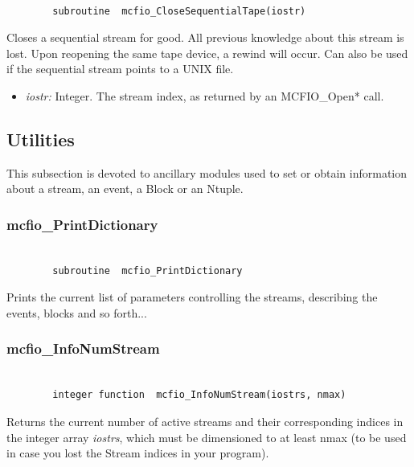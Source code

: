 \begin{verbatim}

        subroutine  mcfio_CloseSequentialTape(iostr)

\end{verbatim}

Closes a sequential stream for good. All previous knowledge
about this stream is lost.  Upon reopening the same tape device, a rewind will
occur. Can also be used if the sequential stream points to a UNIX file.
\begin{itemize}
\item {\em iostr:} Integer. The stream index, as returned by an MCFIO\_Open*
call.
\end{itemize}

\subsection{Utilities}

	This subsection is devoted to ancillary modules used to set or obtain
information about a stream, an event, a Block or an Ntuple.

\subsubsection{mcfio\_PrintDictionary}

\begin{verbatim}

        subroutine  mcfio_PrintDictionary

\end{verbatim}

Prints the current list of parameters controlling the streams,
describing the events, blocks and so forth...

\subsubsection{mcfio\_InfoNumStream}

\begin{verbatim}

        integer function  mcfio_InfoNumStream(iostrs, nmax)

\end{verbatim}

Returns the current number of active streams and their
corresponding indices in the integer array {\em iostrs}, which
must be dimensioned to at least nmax (to be used in case you
lost the Stream indices in your program).

